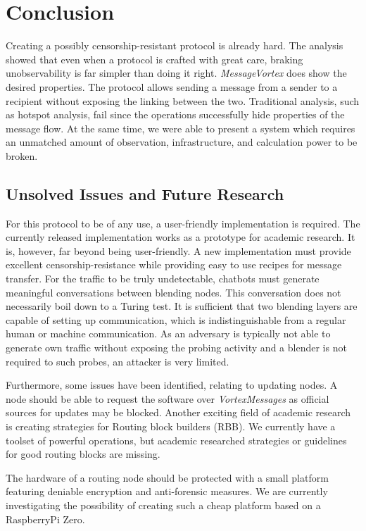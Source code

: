 \documentclass[acmsmall, screen, review]{acmart}
\begin{document}
	\section{Conclusion}
	Creating a possibly censorship-resistant protocol is already hard. The analysis showed that even when a protocol is crafted with great care, braking unobservability is far simpler than doing it right. \emph{MessageVortex} does show the desired properties. The protocol allows sending a message from a sender to a recipient without exposing the linking between the two. Traditional analysis, such as hotspot analysis, fail since the operations successfully hide properties of the message flow. At the same time, we were able to present a system which requires an unmatched amount of observation, infrastructure, and calculation power to be broken.
	
	\subsection{Unsolved Issues and Future Research}
	For this protocol to be of any use, a user-friendly implementation is required. The currently released implementation works as a prototype for academic research. It is, however, far beyond being user-friendly. A new implementation must provide excellent censorship-resistance while providing easy to use recipes for message transfer.  For the traffic to be truly undetectable, chatbots must generate meaningful conversations between blending nodes. This conversation does not necessarily boil down to a Turing test. It is sufficient that two blending layers are capable of setting up communication, which is indistinguishable from a regular human or machine communication. As an adversary is typically not able to generate own traffic without exposing the probing activity and a blender is not required to such probes, an attacker is very limited. 
	
	Furthermore, some issues have been identified, relating to updating nodes. A node should be able to request the software over \emph{VortexMessages} as official sources for updates may be blocked. Another exciting field of academic research is creating strategies for Routing block builders (RBB). We currently have a toolset of powerful operations, but academic researched strategies or guidelines for good routing blocks are missing. 
	
	The hardware of a routing node should be protected with a small platform featuring deniable encryption and anti-forensic measures. We are currently investigating the possibility of creating such a cheap platform based on a RaspberryPi Zero. 
	
\end{document}
